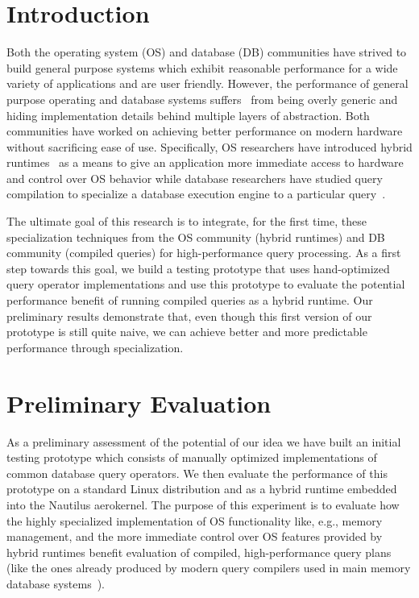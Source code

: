 \documentclass[conference]{IEEEtran}
\begin{document}
\section{Introduction}

  Both the operating system (OS) and database (DB) communities have strived to build general purpose systems which exhibit reasonable performance for a wide variety of applications and are user friendly.
  However, the performance of general purpose operating and database systems suffers~\cite{GICEVA:2016:OS_SUPPORT} from being overly generic and hiding implementation details behind multiple layers of abstraction.
Both communities have worked on achieving better performance on modern hardware without sacrificing ease of use. Specifically, OS researchers have introduced hybrid runtimes~\cite{HALE:2017:MULTIVERSE,HALE:2016:MULTIVERSE,HALE:2015:NAUTILUS,HALE:2016:HRTHVM} as a means to give an application more immediate access to hardware and control over OS behavior while database researchers have studied query compilation to specialize a database execution engine to a particular query~\cite{SK16,N11}.

The ultimate goal of this research is to integrate, for the first time, these specialization techniques from the OS community (hybrid runtimes) and DB community (compiled queries) for high-performance query processing.
As a first step towards this goal, we build a testing prototype that uses hand-optimized query operator implementations and use this prototype to evaluate the potential performance benefit of running compiled queries as a hybrid runtime.
%
Our preliminary results demonstrate that, even though this first version of our prototype is still quite naive, we can achieve better and more predictable performance through specialization.
%





\section{Preliminary Evaluation}

As a preliminary assessment of the potential of our idea we have built an initial testing prototype which consists of manually optimized implementations of common database query operators. We then evaluate the performance of this prototype on a standard Linux distribution and as a hybrid runtime embedded into the Nautilus aerokernel. The purpose of this experiment is to evaluate how the highly specialized implementation of OS functionality like, e.g., memory management, and the more immediate control over OS features provided by hybrid runtimes benefit evaluation of compiled, high-performance query plans (like the ones already produced by modern query compilers used in main memory database systems~\cite{N11}). 
\end{document}
